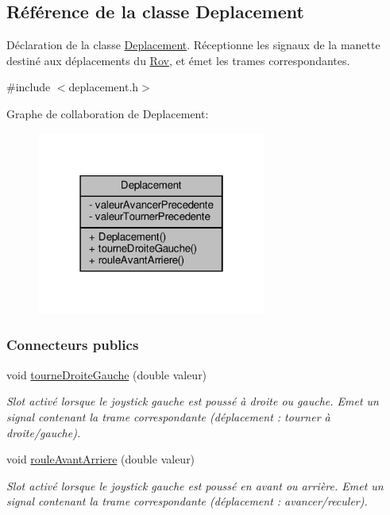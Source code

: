 \hypertarget{class_deplacement}{}\subsection{Référence de la classe Deplacement}
\label{class_deplacement}


Déclaration de la classe \hyperlink{class_deplacement}{Deplacement}. Réceptionne les signaux de la manette destiné aux déplacements du \hyperlink{class_rov}{Rov}, et émet les trames correspondantes.  




{\ttfamily \#include $<$deplacement.\+h$>$}



Graphe de collaboration de Deplacement\+:
\nopagebreak
\begin{figure}[H]
\begin{center}
\leavevmode
\includegraphics[width=214pt]{class_deplacement__coll__graph}
\end{center}
\end{figure}
\subsubsection*{Connecteurs publics}
\begin{DoxyCompactItemize}
\item 
void \hyperlink{class_deplacement_a164cc606a6c5b8d55c1e5475d4d112e0}{tourne\+Droite\+Gauche} (double valeur)
\begin{DoxyCompactList}\small\item\em Slot activé lorsque le joystick gauche est poussé à droite ou gauche. Emet un signal contenant la trame correspondante (déplacement \+: tourner à droite/gauche). \end{DoxyCompactList}\item 
void \hyperlink{class_deplacement_a65a1c6adfe5114d3cfefa631e0c91618}{roule\+Avant\+Arriere} (double valeur)
\begin{DoxyCompactList}\small\item\em Slot activé lorsque le joystick gauche est poussé en avant ou arrière. Emet un signal contenant la trame correspondante (déplacement \+: avancer/reculer). \end{DoxyCompactList}\end{DoxyCompactItemize}
